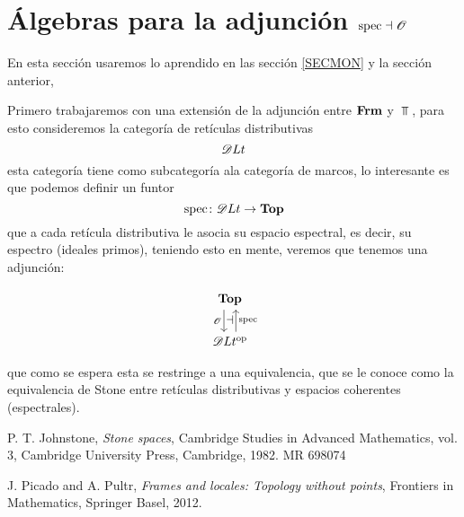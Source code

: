 \documentclass{comunicaciones}
\begin{document}
\section[Álgebras para la adjunción]{Álgebras para la adjunción $\spec\dashv \mathcal{O}$}

En esta sección usaremos lo aprendido en las sección \ref{SECMON} y la sección anterior, 

Primero trabajaremos con una extensión de la adjunción entre $\Frm$ y $\Top$, para esto consideremos la categoría de retículas distributivas 
\[\EuScript{D}Lt\] esta categoría tiene como subcategoría ala categoría de marcos, lo interesante es que podemos definir un funtor 
\[\spec\colon\EuScript{D}Lt\rightarrow\Top \] que a cada retícula distributiva le asocia su espacio espectral, es decir, su espectro (ideales primos), teniendo esto en mente, veremos que
tenemos una adjunción:

\[
  \begin{tikzcd}
    \Top \ar[d,shift right=2,"\Cal O"'{name=L}]
    \\
    \EuScript{D}Lt^\op \ar[u,shift right=2,"\spec"'{name=R}]
    \adj{L}{R}
  \end{tikzcd}
\]

que como se espera esta se restringe a una equivalencia, que se le conoce como la equivalencia de Stone entre retículas distributivas y espacios coherentes (espectrales).

\begin{thebibliography}{99}
   P. T. Johnstone, \textit{Stone spaces}, Cambridge Studies in Advanced Mathematics, vol. 3, Cambridge University Press, Cambridge, 1982. MR 698074
  
   J. Picado and A. Pultr, \textit{Frames and locales: Topology without points}, Frontiers in Mathematics, Springer Basel, 2012.
\end{thebibliography}
\end{document}
